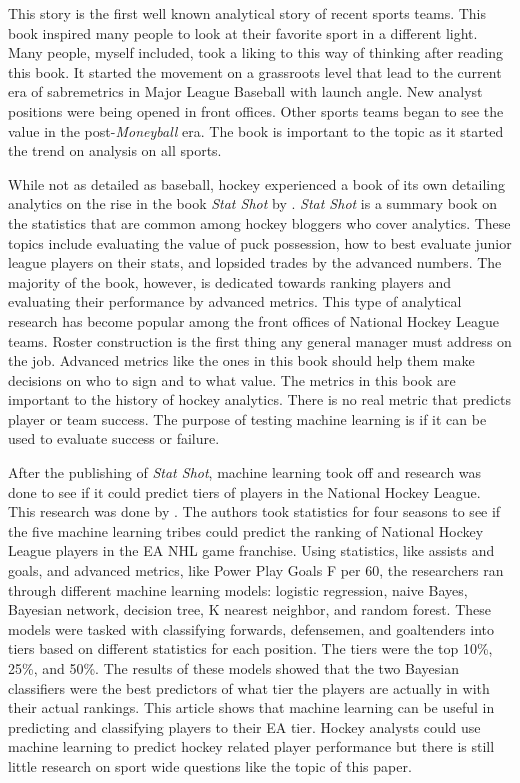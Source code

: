 \documentclass[12pt,english]{article}
\begin{document}
This story is the first well known analytical story of recent sports teams. This book inspired many people to look at their favorite sport in a different light. Many people, myself included, took a liking to this way of thinking after reading this book. It started the movement on a grassroots level that lead to the current era of sabremetrics in Major League Baseball with launch angle. New analyst positions were being opened in front offices. Other sports teams began to see the value in the post-\textit{Moneyball} era. The book is important to the topic as it started the trend on analysis on all sports.

While not as detailed as baseball, hockey experienced a book of its own detailing analytics on the rise in the book \textit{Stat Shot} by \citet{statshot}. \textit{Stat Shot} is a summary book on the statistics that are common among hockey bloggers who cover analytics. These topics include evaluating the value of puck possession, how to best evaluate junior league players on their stats, and lopsided trades by the advanced numbers. The majority of the book, however, is dedicated towards ranking players and evaluating their performance by advanced metrics. This type of analytical research has become popular among the front offices of National Hockey League teams. Roster construction is the first thing any general manager must address on the job. Advanced metrics like the ones in this book should help them make decisions on who to sign and to what value. The metrics in this book are important to the history of hockey analytics. There is no real metric that predicts player or team success. The purpose of testing machine learning is if it can be used to evaluate success or failure.

After the publishing of \textit{Stat Shot}, machine learning took off and research was done to see if it could predict tiers of players in the National Hockey League. This research was done by \citet{lehmus}. The authors took statistics for four seasons to see if the five machine learning tribes could predict the ranking of National Hockey League players in the EA NHL game franchise. Using statistics, like assists and goals, and advanced metrics, like Power Play Goals F per 60, the researchers ran through different machine learning models: logistic regression, naive Bayes, Bayesian network, decision tree, K nearest neighbor, and random forest. These models were tasked with classifying forwards, defensemen, and goaltenders into tiers based on different statistics for each position. The tiers were the top 10\%, 25\%, and 50\%. The results of these models showed that the two Bayesian classifiers were the best predictors of what tier the players are actually in with their actual rankings. This article shows that machine learning can be useful in predicting and classifying players to their EA tier. Hockey analysts could use machine learning to predict hockey related player performance but there is still little research on sport wide questions like the topic of this paper.
\end{document}
